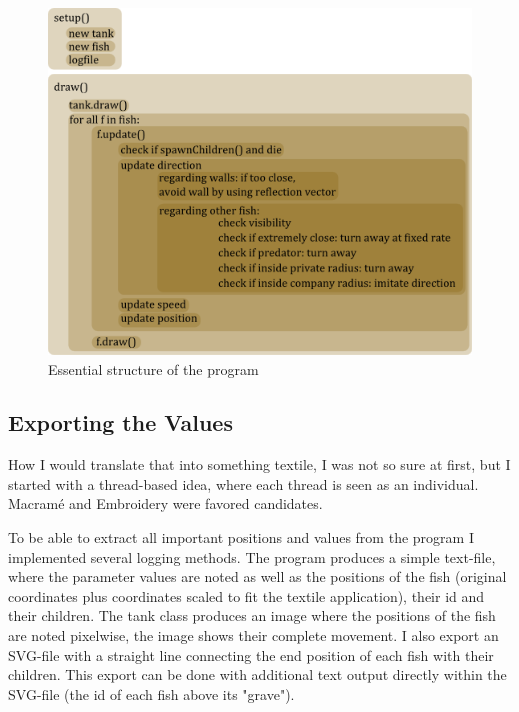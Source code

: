 \documentclass{scrartcl}
\begin{document}
\begin{figure}[h]
        \centering
        \includegraphics[width=\textwidth]{implementationsketch}
        \caption{Essential structure of the program}
        
\end{figure}


\subsection{Exporting the Values}
How I would translate that into something textile, I was not so sure at first, but I started with a thread-based idea, where each thread is seen as an individual. Macramé and Embroidery were favored candidates.

To be able to extract all important positions and values from the program I implemented several logging methods. The program produces a simple text-file, where the parameter values are noted as well as the positions of the fish (original coordinates plus coordinates scaled to fit the textile application), their id and their children. The tank class produces an image where the positions of the fish are noted pixelwise, the image shows their complete movement. I also export an SVG-file with a straight line connecting the end position of each fish with their children. This export can be done with additional text output directly within the SVG-file (the id of each fish above its "grave").
\end{document}
